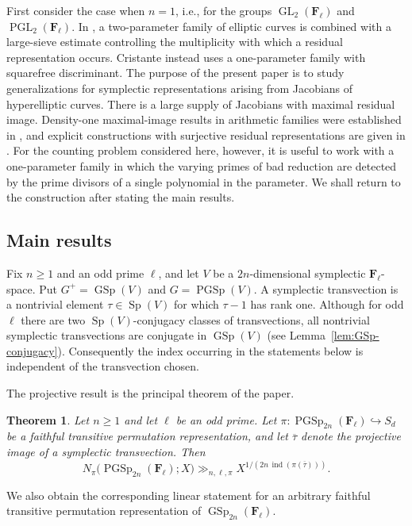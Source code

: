 \documentclass[11pt,hidelinks]{amsart}
\newtheorem{theorem}{Theorem}[section]
\newcommand{\F}{\mathbf F}
\newcommand{\GL}{\operatorname{GL}}
\newcommand{\PGL}{\operatorname{PGL}}
\newcommand{\GSp}{\operatorname{GSp}}
\newcommand{\Sp}{\operatorname{Sp}}
\newcommand{\PGSp}{\operatorname{PGSp}}
\newcommand{\ind}{\operatorname{ind}}
\begin{document}
First consider the case when $n=1$, i.e., for the groups $\GL_2(\F_\ell)$ and $\PGL_2(\F_\ell)$. In \cite{Ray2025}, a two-parameter family of elliptic curves is combined with a large-sieve estimate controlling the multiplicity with which a residual representation occurs. Cristante \cite{Cristante2025} instead uses a one-parameter family with squarefree discriminant. The purpose of the present paper is to study generalizations for symplectic representations arising from Jacobians of hyperelliptic curves. There is a large supply of Jacobians with maximal residual image. Density-one maximal-image results in arithmetic families were established in \cite{LandesmanEtAl2019,LandesmanEtAl2020}, and explicit constructions with surjective residual representations are given in \cite{AnniDokchitser2020}. For the counting problem considered here, however, it is useful to work with a one-parameter family in which the varying primes of bad reduction are detected by the prime divisors of a single polynomial in the parameter. We shall return to the construction after stating the main results.

\subsection{Main results}

Fix $n\geq 1$ and an odd prime $\ell$, and let $V$ be a $2n$-dimensional symplectic $\F_\ell$-space. Put $G^+=\GSp(V)$ and $G=\PGSp(V)$. A symplectic transvection is a nontrivial element $\tau\in\Sp(V)$ for which $\tau-1$ has rank one. Although for odd $\ell$ there are two $\Sp(V)$-conjugacy classes of transvections, all nontrivial symplectic transvections are conjugate in $\GSp(V)$ (see Lemma~\ref{lem:GSp-conjugacy}). Consequently the index occurring in the statements below is independent of the transvection chosen.

The projective result is the principal theorem of the paper.


\begin{theorem}\label{thm:PGSp-main}
Let $n\geq 1$ and let $\ell$ be an odd prime. Let
$\pi:\PGSp_{2n}(\F_\ell)\hookrightarrow S_d$ be a faithful transitive permutation representation, and let $\overline\tau$ denote the projective image of a symplectic transvection. Then
\[
 N_\pi\bigl(\PGSp_{2n}(\F_\ell);X\bigr)
 \gg_{n,\ell,\pi}
 X^{1/(2n\,\ind(\pi(\overline\tau)))}.
\]
\end{theorem}

We also obtain the corresponding linear statement for an arbitrary faithful transitive permutation representation of $\GSp_{2n}(\F_\ell)$.
\end{document}
